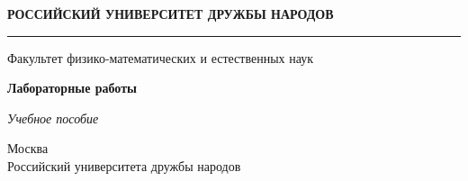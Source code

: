 \begin{titlepage}
  
  \begin{onehalfspace}
    
    \begin{center}
      \textbf{РОССИЙСКИЙ УНИВЕРСИТЕТ ДРУЖБЫ НАРОДОВ}
    \end{center}

    \hrule

    \begin{center}
      Факультет физико-математических и естественных наук
    \end{center}
    
    \vspace{1cm}
    
    

    \vspace{4cm}

    
    \begin{center}


      \textbf{\LARGE{\booktitle}}

      \bigskip

\textbf{Лабораторные работы}

      \bigskip

\textit{Учебное пособие}
    \end{center}
    
    
    
    \vfill
    
    \begin{center}
      Москва \\
      Российский университета дружбы народов \\
      \bookyear{}
    \end{center}
    
  \end{onehalfspace}
  
\end{titlepage}


